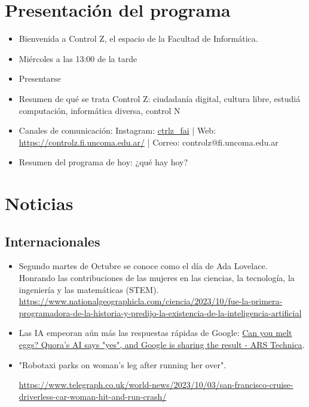\documentclass[11pt]{article}
\begin{document}
\section{Presentación del programa}
\label{sec:orgfcb2075}
\begin{itemize}
\item Bienvenida a Control Z, el espacio de la Facultad de Informática.
\item Miércoles a las 13:00 de la tarde
\item Presentarse
\item Resumen de qué se trata Control Z: ciudadanía digital, cultura libre, estudiá computación, informática diversa, control N
\item Canales de comunicación: Instagram: \href{https://www.instagram.com/ctrlz\_fai/}{ctrlz\_fai} | Web: \url{https://controlz.fi.uncoma.edu.ar/} | Correo: controlz@fi.uncoma.edu.ar
\item Resumen del programa de hoy: ¿qué hay hoy?
\end{itemize}

\section{Noticias}
\label{sec:org4d1c7a0}

\subsection{Internacionales}
\label{sec:org9f29a25}

\begin{itemize}
\item Segundo martes de Octubre se conoce como el día de Ada Lovelace. Honrando las contribuciones de las mujeres en las ciencias, la tecnología, la ingeniería y las matemáticas (STEM).
\url{https://www.nationalgeographicla.com/ciencia/2023/10/fue-la-primera-programadora-de-la-historia-y-predijo-la-existencia-de-la-inteligencia-artificial}
\item Las IA empeoran aún más las respuestas rápidas de Google: \href{https://arstechnica.com/information-technology/2023/09/can-you-melt-eggs-quoras-ai-says-yes-and-google-is-sharing-the-result/}{Can you melt eggs? Quora's AI says "yes", and Google is sharing the result - ARS Technica}.
\item "Robotaxi parks on woman’s leg after running her over".

\url{https://www.telegraph.co.uk/world-news/2023/10/03/san-francisco-cruise-driverless-car-woman-hit-and-run-crash/}
\end{itemize}
\end{document}
